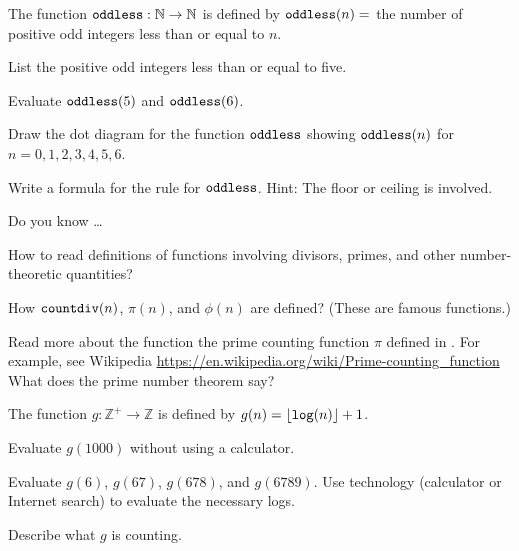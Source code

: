 
\begin{exer}[\exerU] %
\label{exer_odd_numbers_less_than}
    The function $\texttt{oddless}:\mathbb{N} \to \mathbb{N}$ is defined by $\texttt{oddless}(n) =$ the number of positive odd integers less than or equal to $n$.
        \begin{exerpart}
            \item List the positive odd integers less than or equal to five.  
            \item Evaluate $\texttt{oddless}(5)$ and $\texttt{oddless}(6)$.
            \item Draw the dot diagram for the function $\texttt{oddless}$ showing $\texttt{oddless}(n)$ for $n=0,1,2,3,4,5,6$.
            \item Write a formula for the rule for $\texttt{oddless}$. Hint: The floor or ceiling is involved.
        \end{exerpart}
\end{exer}

\begin{exer}[\exerR] %
\label{exer_dyk_number_functions}
    Do you know \ldots
        \begin{exerpart}
            \item How to read definitions of functions involving divisors, primes, and other number-theoretic quantities?
            \item How $\texttt{countdiv}(n)$, $\pi(n)$, and $\phi(n)$ are defined? (These are famous functions.)
        \end{exerpart}
\end{exer}

\begin{exer}[\exerE]
\label{exer_prime_counting_function}
    Read more about the function the prime counting function $\pi$ defined in .  For example, see Wikipedia \url{https://en.wikipedia.org/wiki/Prime-counting_function} What does the prime number theorem say?
\end{exer}

\begin{exer}[\exerE] %
\label{exer_number_digits_revisited}
     The function $g: \mathbb{Z}^+ \to \mathbb{Z}$ is defined by $g(n) = \lfloor \texttt{log}(n) \rfloor + 1$.
         \begin{exerpart}
             \item Evaluate $g(1000)$ without using a calculator.
             \item Evaluate $g(6)$, $g(67)$, $g(678)$, and $g(6789)$.  Use technology (calculator or Internet search) to evaluate the necessary logs.
             \item Describe what $g$ is counting.  
         \end{exerpart}
\end{exer}

